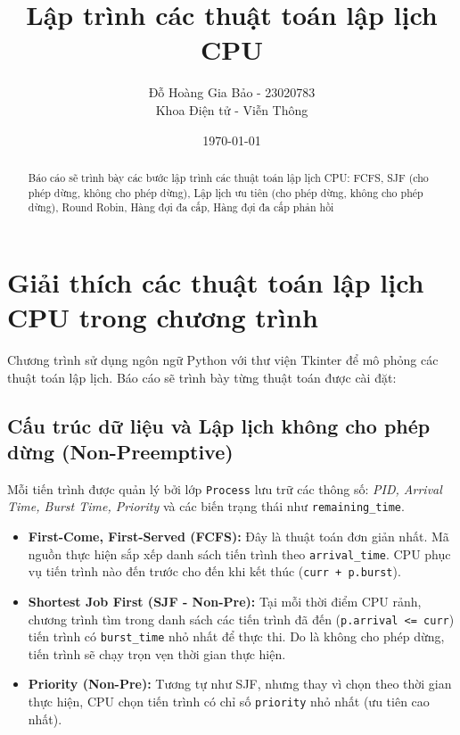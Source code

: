 \documentclass[12pt, letterpaper]{article}
\title{Lập trình các thuật toán lập lịch CPU}
\author{Đỗ Hoàng Gia Bảo - 23020783 \\ \small Khoa Điện tử - Viễn Thông}
\date{\today}
\begin{document}
\maketitle

\begin{abstract}
Báo cáo sẽ trình bày các bước lập trình các thuật toán lập lịch CPU:  FCFS, SJF  (cho phép dừng, không cho phép dừng), Lập lịch ưu tiên (cho phép dừng, không cho phép dừng), Round Robin, Hàng đợi đa cấp, Hàng đợi đa cấp phản hồi 
\end{abstract}
\newpage
\tableofcontents

\newpage
{}
\setcounter{page}{3} %

\section{Giải thích các thuật toán lập lịch CPU trong chương trình}

Chương trình sử dụng ngôn ngữ Python với thư viện Tkinter để mô phỏng các thuật toán lập lịch. Báo cáo sẽ trình bày từng thuật toán được cài đặt:

\subsection{Cấu trúc dữ liệu và Lập lịch không cho phép dừng (Non-Preemptive)}

Mỗi tiến trình được quản lý bởi lớp \texttt{Process} lưu trữ các thông số: \textit{PID, Arrival Time, Burst Time, Priority} và các biến trạng thái như \texttt{remaining\_time}.

\begin{itemize}
    \item \textbf{First-Come, First-Served (FCFS):} 
    Đây là thuật toán đơn giản nhất. Mã nguồn thực hiện sắp xếp danh sách tiến trình theo \texttt{arrival\_time}. CPU phục vụ tiến trình nào đến trước cho đến khi kết thúc (\texttt{curr + p.burst}).
    
    \item \textbf{Shortest Job First (SJF - Non-Pre):} 
    Tại mỗi thời điểm CPU rảnh, chương trình tìm trong danh sách các tiến trình đã đến (\texttt{p.arrival <= curr}) tiến trình có \texttt{burst\_time} nhỏ nhất để thực thi. Do là không cho phép dừng, tiến trình sẽ chạy trọn vẹn thời gian thực hiện.
    
    \item \textbf{Priority (Non-Pre):} 
    Tương tự như SJF, nhưng thay vì chọn theo thời gian thực hiện, CPU chọn tiến trình có chỉ số \texttt{priority} nhỏ nhất (ưu tiên cao nhất).
\end{itemize}
\end{document}
